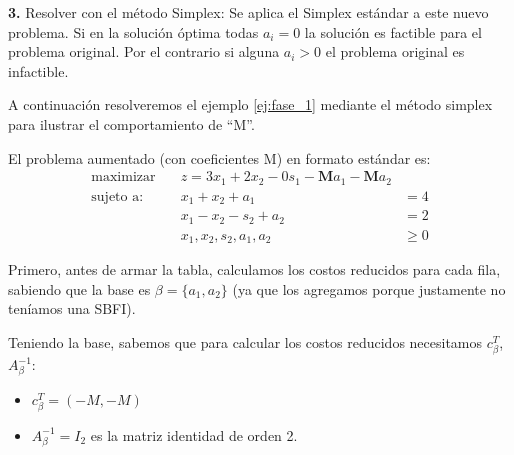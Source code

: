 \noindent\textbf{3.} Resolver con el método Simplex: Se aplica el Simplex estándar a este nuevo problema. Si en la solución óptima todas \(a_i = 0\) la solución es factible para el problema original. Por el contrario si alguna \(a_i > 0\) el problema original es infactible.

A continuación resolveremos el ejemplo \ref{ej:fase_1} mediante el método simplex para ilustrar el comportamiento de ``M''.

El problema aumentado (con coeficientes M) en formato estándar es:
\begin{align*}
  \text{maximizar} \quad  &z = 3x_1 + 2x_2 - 0s_1 - \mathbf{M}a_1 - \mathbf{M}a_2\\[3pt]
  \text{sujeto a:} \quad  &x_1 + x_2 + a_1 &= 4 \\
                          &x_1 - x_2 - s_2 + a_2 &= 2 \\
                          &x_1, x_2, s_2, a_1, a_2 &\geq 0
\end{align*}

Primero, antes de armar la tabla, calculamos los costos reducidos para cada fila, sabiendo que la base es \(\beta = \{a_1,a_2\}\) (ya que los agregamos porque justamente no teníamos una SBFI).

Teniendo la base, sabemos que para calcular los costos reducidos necesitamos \(c_\beta ^T\), \(A_\beta ^{-1}\):
\begin{itemize}
  \item \(c_\beta ^T = (-M,-M)\)
  \item \(A_\beta ^{-1} = I_2\) es la matriz identidad de orden 2.
\end{itemize}

